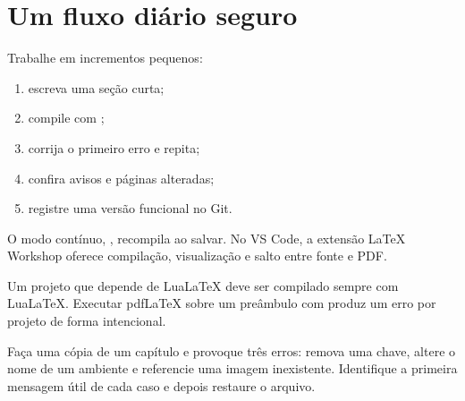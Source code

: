 \section{Um fluxo diário seguro}

Trabalhe em incrementos pequenos:

\begin{enumerate}
  \item escreva uma seção curta;
  \item compile com ;
  \item corrija o primeiro erro e repita;
  \item confira avisos e páginas alteradas;
  \item registre uma versão funcional no Git.
\end{enumerate}

O modo contínuo, , recompila ao salvar.
No VS Code, a extensão LaTeX Workshop oferece compilação, visualização e salto
entre fonte e PDF.

\begin{atencao}
  Um projeto que depende de LuaLaTeX deve ser compilado sempre com LuaLaTeX.
  Executar pdfLaTeX sobre um preâmbulo com  produz um erro por
  projeto de forma intencional.
\end{atencao}

\begin{pratica}
  Faça uma cópia de um capítulo e provoque três erros: remova uma chave, altere
  o nome de um ambiente e referencie uma imagem inexistente. Identifique a
  primeira mensagem útil de cada caso e depois restaure o arquivo.
\end{pratica}

